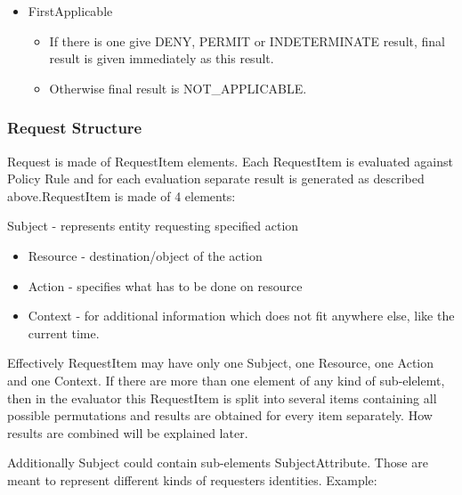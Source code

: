 \documentclass{article}
\newcommand\liststyleWWviiiNumxvii{%
\renewcommand\labelitemi{o}
\renewcommand\labelitemii{o}
\renewcommand\labelitemiii{[F0A7?]}
\renewcommand\labelitemiv{[F0B7?]}
}
\newcommand\liststyleWWviiiNumxix{%
\renewcommand\theenumi{\arabic{enumi}}
\renewcommand\theenumii{\arabic{enumii}}
\renewcommand\theenumiii{\arabic{enumiii}}
\renewcommand\labelitemi{o}
\renewcommand\labelenumi{\theenumi.}
\renewcommand\labelenumii{\theenumii.}
\renewcommand\labelenumiii{\theenumiii.}
}
\begin{document}
\liststyleWWviiiNumxvii
\begin{itemize}
\item {\color{black}
FirstApplicable}

\begin{itemize}
\item {\color{black}
If there is one give DENY, PERMIT or INDETERMINATE result, final result
is given immediately as this result.}
\item {\color{black}
Otherwise final result is NOT\_APPLICABLE.}
\end{itemize}
\end{itemize}
\subsubsection{Request Structure}
{\color{black}
Request is made of RequestItem elements. Each RequestItem is evaluated
against Policy Rule and for each evaluation separate result is
generated as described above.RequestItem is made of 4 elements:}

{\color{black}
Subject - represents entity requesting specified action}

\liststyleWWviiiNumxix
\begin{itemize}
\item {\color{black}
Resource - destination/object of the action}
\item {\color{black}
Action - specifies what has to be done on resource}
\item {\color{black}
Context - for additional information which does not fit anywhere else,
like the current time.}
\end{itemize}
{\color{black}
Effectively RequestItem may have only one Subject, one Resource, one
Action and one Context. If there are more than one element of any kind
of sub-elelemt, then in the evaluator this RequestItem is split into
several items containing all possible permutations and results are
obtained for every item separately. How results are combined will be
explained later.}

{\color{black}
Additionally Subject could contain sub-elements SubjectAttribute. Those
are meant to represent different kinds of requesters{\textquotesingle}
identities. Example:}
\end{document}
